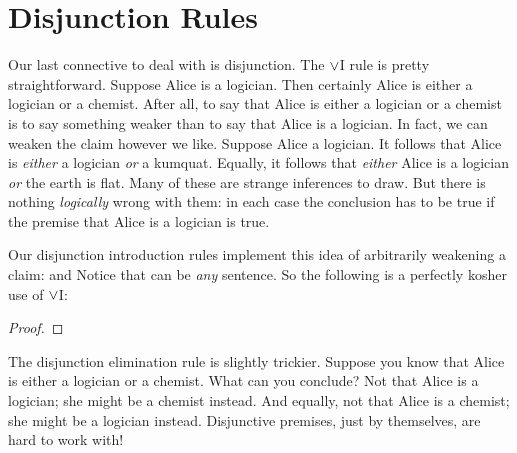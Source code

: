 \section{Disjunction Rules}
Our last connective to deal with is disjunction.  The $\vee$I rule is pretty straightforward.  Suppose Alice is a logician. Then certainly Alice is either a logician or a chemist. After all, to say that Alice is either a logician or a chemist is to say something weaker than to say that Alice is a logician. In fact, we can weaken the claim however we like. Suppose Alice a logician. It follows that Alice is \emph{either} a logician \emph{or} a kumquat.   Equally, it follows that \emph{either} Alice is a logician \emph{or} the earth is flat. Many of these are strange inferences to draw. But there is nothing \emph{logically} wrong with them: in each case the conclusion has to be true if the premise that Alice is a logician is true.


Our disjunction introduction rules implement this idea of arbitrarily weakening a claim:
and
Notice that \meta{\psi} can be \emph{any} sentence. So the following is a perfectly kosher use of $\vee$I:
\begin{proof}
\end{proof}


The disjunction elimination rule is slightly trickier. Suppose you know that Alice is either a logician or a chemist. What can you conclude? Not that Alice is a logician; she might be a chemist instead. And equally, not that Alice is a chemist; she might be a logician instead. Disjunctive premises, just by themselves, are hard to work with!

